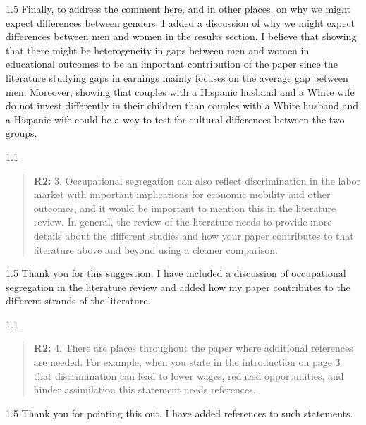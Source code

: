 \documentclass[12pt,english]{article}
\newcommand{\rrquote}{1.1}
\newcommand{\rrxspc}{1.5}
\begin{document}
\begin{refsection}
\begin{spacing}{\rrxspc}
            Finally, to address the comment here, and in other places, on why we might expect differences between genders. I added a discussion of why we might expect differences between men and women in the results section. I believe that showing that there might be heterogeneity in gaps between men and women in educational outcomes to be an important contribution of the paper since the literature studying gaps in earnings mainly focuses on the average gap between men. Moreover, showing that couples with a Hispanic husband and a White wife do not invest differently in their children than couples with a White husband and a Hispanic wife could be a way to test for cultural differences between the two groups. 
        \end{spacing}

    \begin{spacing}{\rrquote}
        \begin{quotation}
        \textbf{R2: } 3. Occupational segregation can also reflect discrimination in the labor market with important implications for economic mobility and other outcomes, and it would be important to mention this in the literature review. In general, the review of the literature needs to provide more details about the different studies and how your paper contributes to that literature above and beyond using a cleaner comparison.
        \end{quotation}
        \end{spacing}
        
        \begin{spacing}{\rrxspc}
            Thank you for this suggestion. I have included a discussion of occupational segregation in the literature review and added how my paper contributes to the different strands of the literature.
    \end{spacing}

    \begin{spacing}{\rrquote}
        \begin{quotation}
        \textbf{R2: } 4. There are places throughout the paper where additional references are needed. For example, when you state in the introduction on page 3 that discrimination can lead to lower wages, reduced opportunities, and hinder assimilation this statement needs references.
        \end{quotation}
        \end{spacing}
        
        \begin{spacing}{\rrxspc}
            Thank you for pointing this out. I have added references to such statements. 
    \end{spacing}


\end{refsection}
\end{document}
